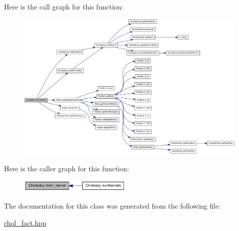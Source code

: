 Here is the call graph for this function:\nopagebreak
\begin{figure}[H]
\begin{center}
\leavevmode
\includegraphics[width=420pt]{class_cholesky_ab0b681bba7b9c3f706d18a6d15fe905f_cgraph}
\end{center}
\end{figure}


Here is the caller graph for this function:\nopagebreak
\begin{figure}[H]
\begin{center}
\leavevmode
\includegraphics[width=153pt]{class_cholesky_ab0b681bba7b9c3f706d18a6d15fe905f_icgraph}
\end{center}
\end{figure}


The documentation for this class was generated from the following file:\begin{DoxyCompactItemize}
\item 
\hyperlink{chol__fact_8hpp}{chol\_\-fact.hpp}\end{DoxyCompactItemize}
